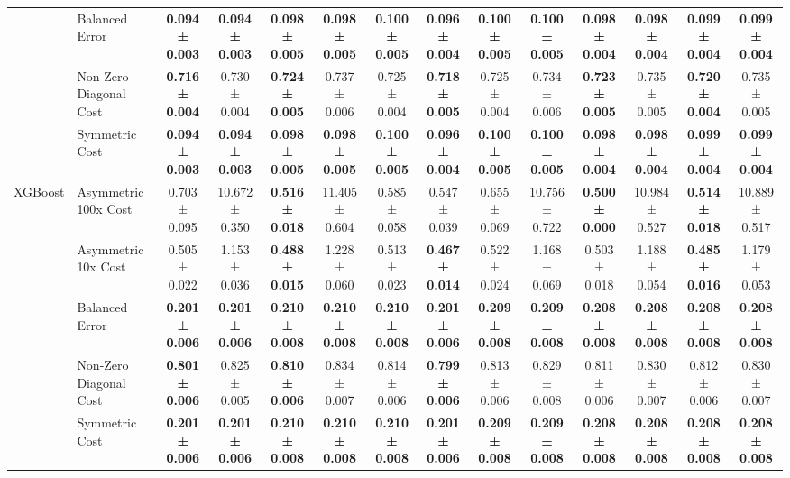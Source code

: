 \begin{table}[H]
{\begin{tabular}{llcccccccccccc}
 & Balanced Error & \textbf{0.094 ± 0.003} & \textbf{0.094 ± 0.003} & \textbf{0.098 ± 0.005} & \textbf{0.098 ± 0.005} & \textbf{0.100 ± 0.005} & \textbf{0.096 ± 0.004} & \textbf{0.100 ± 0.005} & \textbf{0.100 ± 0.005} & \textbf{0.098 ± 0.004} & \textbf{0.098 ± 0.004} & \textbf{0.099 ± 0.004} & \textbf{0.099 ± 0.004} \\
 & Non-Zero Diagonal Cost & \textbf{0.716 ± 0.004} & 0.730 ± 0.004 & \textbf{0.724 ± 0.005} & 0.737 ± 0.006 & 0.725 ± 0.004 & \textbf{0.718 ± 0.005} & 0.725 ± 0.004 & 0.734 ± 0.006 & \textbf{0.723 ± 0.005} & 0.735 ± 0.005 & \textbf{0.720 ± 0.004} & 0.735 ± 0.005 \\
 & Symmetric Cost & \textbf{0.094 ± 0.003} & \textbf{0.094 ± 0.003} & \textbf{0.098 ± 0.005} & \textbf{0.098 ± 0.005} & \textbf{0.100 ± 0.005} & \textbf{0.096 ± 0.004} & \textbf{0.100 ± 0.005} & \textbf{0.100 ± 0.005} & \textbf{0.098 ± 0.004} & \textbf{0.098 ± 0.004} & \textbf{0.099 ± 0.004} & \textbf{0.099 ± 0.004} \\
\cline{1-14}
\multirow[t]{5}{*}{XGBoost} & Asymmetric 100x Cost & 0.703 ± 0.095 & 10.672 ± 0.350 & \textbf{0.516 ± 0.018} & 11.405 ± 0.604 & 0.585 ± 0.058 & 0.547 ± 0.039 & 0.655 ± 0.069 & 10.756 ± 0.722 & \textbf{0.500 ± 0.000} & 10.984 ± 0.527 & \textbf{0.514 ± 0.018} & 10.889 ± 0.517 \\
 & Asymmetric 10x Cost & 0.505 ± 0.022 & 1.153 ± 0.036 & \textbf{0.488 ± 0.015} & 1.228 ± 0.060 & 0.513 ± 0.023 & \textbf{0.467 ± 0.014} & 0.522 ± 0.024 & 1.168 ± 0.069 & 0.503 ± 0.018 & 1.188 ± 0.054 & \textbf{0.485 ± 0.016} & 1.179 ± 0.053 \\
 & Balanced Error & \textbf{0.201 ± 0.006} & \textbf{0.201 ± 0.006} & \textbf{0.210 ± 0.008} & \textbf{0.210 ± 0.008} & \textbf{0.210 ± 0.008} & \textbf{0.201 ± 0.006} & \textbf{0.209 ± 0.008} & \textbf{0.209 ± 0.008} & \textbf{0.208 ± 0.008} & \textbf{0.208 ± 0.008} & \textbf{0.208 ± 0.008} & \textbf{0.208 ± 0.008} \\
 & Non-Zero Diagonal Cost & \textbf{0.801 ± 0.006} & 0.825 ± 0.005 & \textbf{0.810 ± 0.006} & 0.834 ± 0.007 & 0.814 ± 0.006 & \textbf{0.799 ± 0.006} & 0.813 ± 0.006 & 0.829 ± 0.008 & 0.811 ± 0.006 & 0.830 ± 0.007 & 0.812 ± 0.006 & 0.830 ± 0.007 \\
 & Symmetric Cost & \textbf{0.201 ± 0.006} & \textbf{0.201 ± 0.006} & \textbf{0.210 ± 0.008} & \textbf{0.210 ± 0.008} & \textbf{0.210 ± 0.008} & \textbf{0.201 ± 0.006} & \textbf{0.209 ± 0.008} & \textbf{0.209 ± 0.008} & \textbf{0.208 ± 0.008} & \textbf{0.208 ± 0.008} & \textbf{0.208 ± 0.008} & \textbf{0.208 ± 0.008} \\
\cline{1-14}
\bottomrule
\end{tabular}
    }
\end{table}
